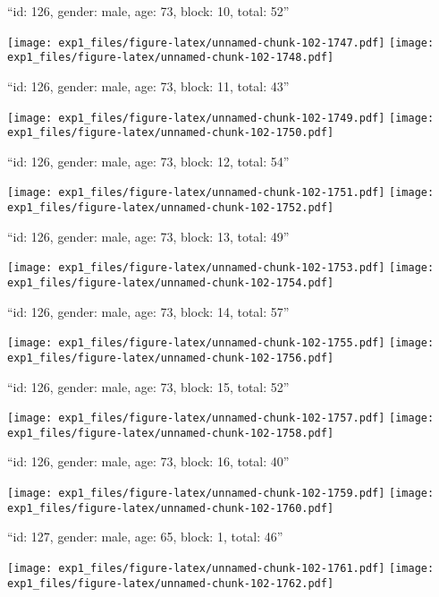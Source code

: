 \documentclass[11pt,,]{article}
\begin{document}
\newpage
[1] 

``id: 126, gender: male, age: 73, block: 10, total: 52''

\texttt{[image: exp1\_files/figure-latex/unnamed-chunk-102-1747.pdf]}
\texttt{[image: exp1\_files/figure-latex/unnamed-chunk-102-1748.pdf]}

\newpage
[1] 

``id: 126, gender: male, age: 73, block: 11, total: 43''

\texttt{[image: exp1\_files/figure-latex/unnamed-chunk-102-1749.pdf]}
\texttt{[image: exp1\_files/figure-latex/unnamed-chunk-102-1750.pdf]}

\newpage
[1] 

``id: 126, gender: male, age: 73, block: 12, total: 54''

\texttt{[image: exp1\_files/figure-latex/unnamed-chunk-102-1751.pdf]}
\texttt{[image: exp1\_files/figure-latex/unnamed-chunk-102-1752.pdf]}

\newpage
[1] 

``id: 126, gender: male, age: 73, block: 13, total: 49''

\texttt{[image: exp1\_files/figure-latex/unnamed-chunk-102-1753.pdf]}
\texttt{[image: exp1\_files/figure-latex/unnamed-chunk-102-1754.pdf]}

\newpage
[1] 

``id: 126, gender: male, age: 73, block: 14, total: 57''

\texttt{[image: exp1\_files/figure-latex/unnamed-chunk-102-1755.pdf]}
\texttt{[image: exp1\_files/figure-latex/unnamed-chunk-102-1756.pdf]}

\newpage
[1] 

``id: 126, gender: male, age: 73, block: 15, total: 52''

\texttt{[image: exp1\_files/figure-latex/unnamed-chunk-102-1757.pdf]}
\texttt{[image: exp1\_files/figure-latex/unnamed-chunk-102-1758.pdf]}

\newpage
[1] 

``id: 126, gender: male, age: 73, block: 16, total: 40''

\texttt{[image: exp1\_files/figure-latex/unnamed-chunk-102-1759.pdf]}
\texttt{[image: exp1\_files/figure-latex/unnamed-chunk-102-1760.pdf]}

\newpage
[1] 

``id: 127, gender: male, age: 65, block: 1, total: 46''

\texttt{[image: exp1\_files/figure-latex/unnamed-chunk-102-1761.pdf]}
\texttt{[image: exp1\_files/figure-latex/unnamed-chunk-102-1762.pdf]}
\end{document}
